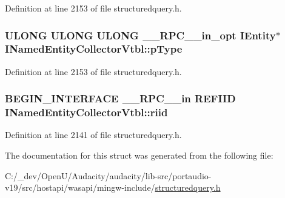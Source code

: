 Definition at line 2153 of file structuredquery.\+h.

\subsubsection[{\texorpdfstring{p\+Type}{pType}}]{ {\bf U\+L\+O\+NG} {\bf U\+L\+O\+NG} {\bf U\+L\+O\+NG} {\bf \+\_\+\+\_\+\+R\+P\+C\+\_\+\+\_\+in\+\_\+opt} {\bf I\+Entity}$\ast$ I\+Named\+Entity\+Collector\+Vtbl\+::p\+Type}\hypertarget{struct_i_named_entity_collector_vtbl_a3cd24f5fb6b13e5471925d2f51867438}{}\label{struct_i_named_entity_collector_vtbl_a3cd24f5fb6b13e5471925d2f51867438}


Definition at line 2153 of file structuredquery.\+h.

\subsubsection[{\texorpdfstring{riid}{riid}}]{\setlength{\rightskip}{0pt plus 5cm}B\+E\+G\+I\+N\+\_\+\+I\+N\+T\+E\+R\+F\+A\+CE {\bf \+\_\+\+\_\+\+R\+P\+C\+\_\+\+\_\+in} {\bf R\+E\+F\+I\+ID} I\+Named\+Entity\+Collector\+Vtbl\+::riid}\hypertarget{struct_i_named_entity_collector_vtbl_a684365f0bf884695fb0471a289301150}{}\label{struct_i_named_entity_collector_vtbl_a684365f0bf884695fb0471a289301150}


Definition at line 2141 of file structuredquery.\+h.



The documentation for this struct was generated from the following file\+:\begin{DoxyCompactItemize}
\item 
C\+:/\+\_\+dev/\+Open\+U/\+Audacity/audacity/lib-\/src/portaudio-\/v19/src/hostapi/wasapi/mingw-\/include/\hyperlink{structuredquery_8h}{structuredquery.\+h}\end{DoxyCompactItemize}
